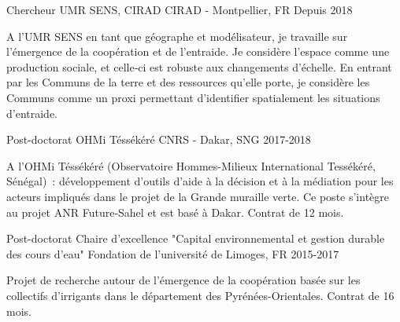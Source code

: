 

\begin{cventries}

  \cventry
    {Chercheur} %
    {UMR SENS, CIRAD} %
    {CIRAD - Montpellier, FR} %
    {Depuis 2018} %
    {
      \begin{cvitems} %
        A l'UMR SENS en tant que géographe et modélisateur, je travaille sur l’émergence de la coopération et de l’entraide. Je considère l’espace comme une production sociale, et celle‑ci est robuste aux changements d’échelle. En entrant par les Communs de la terre et des ressources qu’elle porte, je considère les Communs comme un proxi permettant d’identifier spatialement les situations d’entraide.
      \end{cvitems}
    }


\cventry
  {Post-doctorat} %
  {OHMi Téssékéré} %
  {CNRS - Dakar, SNG} %
  {2017-2018} %
  {
    \begin{cvitems} %
      A l’OHMi Téssékéré (Observatoire Hommes-Milieux International Tessékéré, Sénégal) : développement d’outils d’aide à la décision et à la médiation pour les acteurs impliqués dans le projet de la Grande muraille verte. Ce poste s’intègre au projet ANR Future‑Sahel et est basé à Dakar. Contrat de 12 mois.
    \end{cvitems}
  }

\cventry
  {Post-doctorat} %
  {Chaire d'excellence "Capital environnemental et gestion durable des cours d'eau"} %
  {Fondation de l'université de Limoges, FR} %
  {2015-2017} %
  {
    \begin{cvitems} %
      Projet de recherche autour de l'émergence de la coopération basée sur les collectifs d'irrigants dans le département des Pyrénées-Orientales. Contrat de 16 mois.
    \end{cvitems}
  }


\end{cventries}

